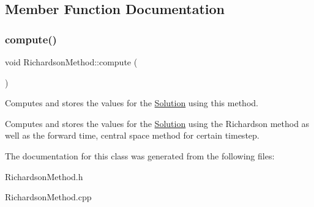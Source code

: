 \subsection{Member Function Documentation}
\mbox{\label{class_richardson_method_acefe085864b041381f1a7fd3af46d7fb}} 
\subsubsection{\texorpdfstring{compute()}{compute()}}
{\footnotesize\ttfamily void Richardson\+Method\+::compute (\begin{DoxyParamCaption}{ }\end{DoxyParamCaption})}

Computes and stores the values for the \hyperlink{class_solution}{Solution} using this method.

Computes and stores the values for the \hyperlink{class_solution}{Solution} using the Richardson method as well as the forward time, central space method for certain timestep. 

The documentation for this class was generated from the following files\+:\begin{DoxyCompactItemize}
\item 
Richardson\+Method.\+h\item 
Richardson\+Method.\+cpp\end{DoxyCompactItemize}
